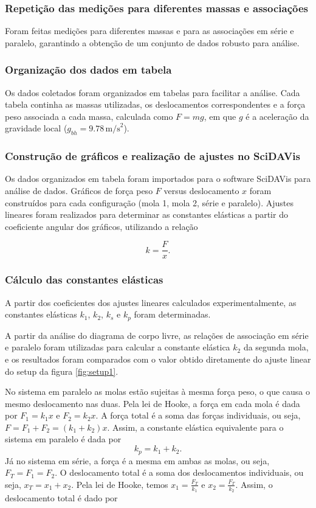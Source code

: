 \documentclass[12pt,a4paper]{article}
\begin{document}
\subsubsection{Repetição das medições para diferentes massas e associações}
Foram feitas medições para diferentes massas e para as associações em série e paralelo, garantindo a obtenção de um conjunto de dados robusto para análise.

\subsubsection{Organização dos dados em tabela}
Os dados coletados foram organizados em tabelas para facilitar a análise. Cada tabela continha as massas utilizadas, os deslocamentos correspondentes e a força peso associada a cada massa, calculada como $F = mg$, em que $g$ é a aceleração da gravidade local ($g_{bh} = 9.78 \, \text{m/s}^2$).

\subsubsection{Construção de gráficos e realização de ajustes no SciDAVis}
Os dados organizados em tabela foram importados para o software SciDAVis para análise de dados. Gráficos de força peso $F$ versus deslocamento $x$ foram construídos para cada configuração (mola 1, mola 2, série e paralelo). Ajustes lineares foram realizados para determinar as constantes elásticas a partir do coeficiente angular dos gráficos, utilizando a relação 

\begin{equation}
    k = \frac{F}{x}.
\end{equation}

\subsubsection{Cálculo das constantes elásticas}
A partir dos coeficientes dos ajustes lineares calculados experimentalmente, as constantes elásticas $k_1$, $k_2$, $k_s$ e $k_p$ foram determinadas.

A partir da análise do diagrama de corpo livre, as relações de associação em série e paralelo foram utilizadas para calcular a constante elástica $k_2$ da segunda mola, e os resultados foram comparados com o valor obtido diretamente do ajuste linear do setup da figura \ref{fig:setup1}.

No sistema em paralelo as molas estão sujeitas à mesma força peso, o que causa o mesmo deslocamento nas duas. Pela lei de Hooke, a força em cada mola é dada por $F_1 = k_1 x$ e $F_2 = k_2 x$. A força total é a soma das forças individuais, ou seja, $F = F_1 + F_2 = (k_1 + k_2)x$. Assim, a constante elástica equivalente para o sistema em paralelo é dada por
\begin{equation}
    k_p = k_1 + k_2.
    \label{eq:parallel}
\end{equation}
Já no sistema em série, a força é a mesma em ambas as molas, ou seja, $F_T = F_1 = F_2$. O deslocamento total é a soma dos deslocamentos individuais, ou seja, $x_T = x_1 + x_2$. Pela lei de Hooke, temos $x_1 = \frac{F_T}{k_1}$ e $x_2 = \frac{F_T}{k_2}$. Assim, o deslocamento total é dado por
\end{document}
